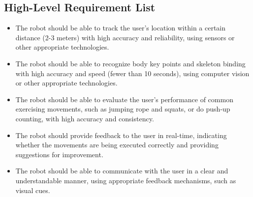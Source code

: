 \subsection{High-Level Requirement List}
\begin{itemize}
    \item The robot should be able to track the user's location within a certain distance (2-3 meters) with high accuracy and reliability, using sensors or other appropriate technologies.
    \item The robot should be able to recognize body key points and skeleton binding with high accuracy and speed (fewer than 10 seconds), using computer vision or other appropriate technologies.
    \item The robot should be able to evaluate the user's performance of common exercising movements, such as jumping rope and squats, or do push-up counting, with high accuracy and consistency.
    \item The robot should provide feedback to the user in real-time, indicating whether the movements are being executed correctly and providing suggestions for improvement.
    \item The robot should be able to communicate with the user in a clear and understandable manner, using appropriate feedback mechanisms, such as visual cues.
    \end{itemize}
